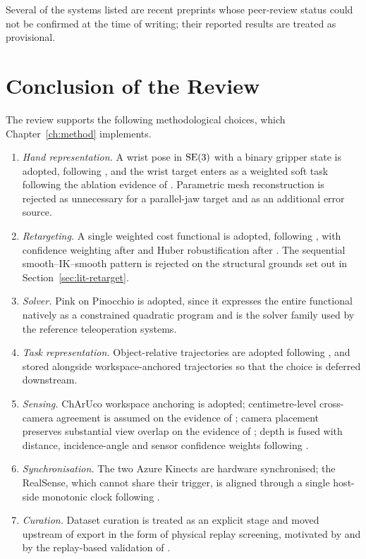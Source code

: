 Several of the systems listed are recent preprints
\cite{howtransfer, robopaint, shadowing, dexcanvas} whose peer-review status
could not be confirmed at the time of writing; their reported results are
treated as provisional.

\section{Conclusion of the Review}
\label{sec:lit-conclusion}

The review supports the following methodological choices, which
Chapter~\ref{ch:method} implements.

\begin{enumerate}[leftmargin=2em]
  \item \emph{Hand representation.} A wrist pose in $\mathrm{SE}(3)$ with a binary gripper
        state is adopted, following \cite{opentv, bunny, ace}, and the wrist
        target enters as a weighted soft task following the ablation evidence
        of \cite{keyobj}. Parametric mesh reconstruction is rejected as
        unnecessary for a parallel-jaw target and as an additional error source.
  \item \emph{Retargeting.} A single weighted cost functional is adopted,
        following \cite{anyteleop, dexflow}, with confidence weighting after
        \cite{opentv} and Huber robustification after \cite{dexteleop0}. The
        sequential smooth--IK--smooth pattern is rejected on the structural
        grounds set out in Section~\ref{sec:lit-retarget}.
  \item \emph{Solver.} Pink on Pinocchio \cite{pink} is adopted, since it
        expresses the entire functional natively as a constrained quadratic
        program and is the solver family used by the reference teleoperation
        systems.
  \item \emph{Task representation.} Object-relative trajectories are adopted
        following \cite{orion, spot}, and stored alongside workspace-anchored
        trajectories so that the choice is deferred downstream.
  \item \emph{Sensing.} ChArUco workspace anchoring is adopted; centimetre-level
        cross-camera agreement is assumed on the evidence of \cite{romeo};
        camera placement preserves substantial view overlap on the evidence of
        \cite{bulee}; depth is fused with distance, incidence-angle and sensor
        confidence weights following \cite{fusionpatent, zeng}.
  \item \emph{Synchronisation.} The two Azure Kinects are hardware
        synchronised; the RealSense, which cannot share their trigger, is
        aligned through a single host-side monotonic clock following
        \cite{ridgerun}.
  \item \emph{Curation.} Dataset curation is treated as an explicit stage and
        moved upstream of export in the form of physical replay screening,
        motivated by \cite{demoscore} and by the replay-based validation of
        \cite{howtransfer}.
\end{enumerate}
